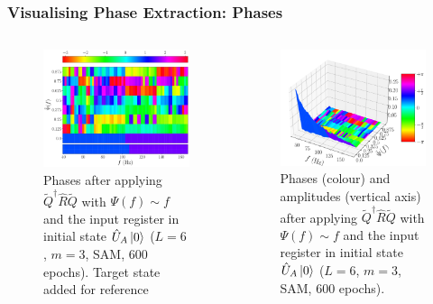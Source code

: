 \documentclass{beamer}
\begin{document}
\begin{frame}
\frametitle{Visualising Phase Extraction: Phases}
\begin{columns}
\begin{column}{0.5\textwidth}
\begin{figure}
\centering 
\includegraphics[width=\textwidth]{im/QRQ_phase_linear_UA}
\caption{Phases after applying $\tilde{Q}^\dagger\hat{R}\tilde{Q}$ with $\Psi(f) \sim f$ and the input register in initial state $\hat{U}_A \ket{0}$ ($L=6$, $m=3$, SAM, 600 epochs). Target state added for reference}
\end{figure}
\end{column}
\begin{column}{0.5\textwidth}
\begin{figure}
\centering 
\includegraphics[width=\textwidth]{im/QRQ_3D_linear_UA}
\caption{Phases (colour) and amplitudes (vertical axis) after applying $\tilde{Q}^\dagger \hat{R}\tilde{Q}$ with $\Psi(f) \sim f$ and the input register in initial state $\hat{U}_A \ket{0}$ ($L=6$, $m=3$, SAM, 600 epochs).}
\end{figure}
\end{column}
\end{columns}
\end{frame}
\end{document}
